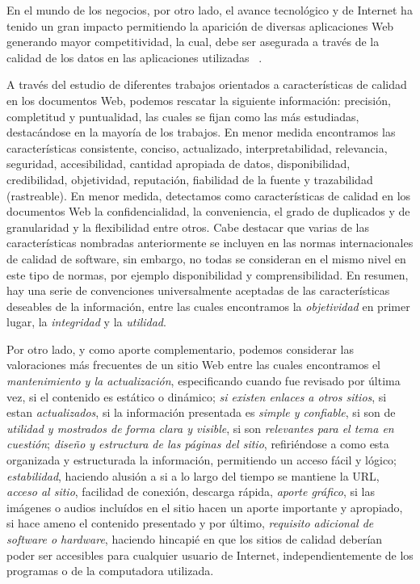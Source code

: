 En el mundo de los negocios, por otro lado, el avance tecnol\'ogico y de Internet ha tenido un gran impacto  permitiendo la aparici\'on de diversas aplicaciones Web generando mayor competitividad, la cual, debe ser asegurada a trav\'es de la calidad de los datos en las aplicaciones utilizadas ~\cite{MaCcIcMp:05}.

A trav\'es del estudio de diferentes trabajos orientados a caracter\'isticas de calidad en los documentos Web, podemos rescatar la siguiente informaci\'on: precisi\'on, completitud y puntualidad, las cuales se fijan como las m\'as estudiadas, destac\'andose en la mayor\'ia de los trabajos. En menor medida encontramos las caracter\'isticas consistente, conciso, actualizado, interpretabilidad, relevancia, seguridad, accesibilidad, cantidad apropiada de datos, disponibilidad, credibilidad, objetividad, reputaci\'on, fiabilidad de la fuente y trazabilidad (rastreable). En menor medida, detectamos como caracter\'isticas de calidad en los documentos Web la confidencialidad, la conveniencia, el grado de duplicados y de granularidad y la flexibilidad entre otros. Cabe destacar que varias de las caracter\'isticas nombradas anteriormente se incluyen en las normas internacionales de calidad de software, sin embargo, no todas se consideran en el mismo nivel en este tipo de normas, por ejemplo disponibilidad y comprensibilidad. En resumen, hay una serie de convenciones universalmente aceptadas de las caracter\'isticas deseables de la informaci\'on, entre las cuales encontramos la \emph{objetividad} en primer lugar, la \emph{integridad} y la \emph{utilidad}.

Por otro lado, y como aporte complementario, podemos considerar las valoraciones m\'as frecuentes de un sitio Web entre las cuales encontramos el \emph{mantenimiento y la actualizaci\'on}, especificando cuando fue revisado por \'ultima vez, si el contenido es est\'atico o din\'amico; \emph{si existen enlaces a otros sitios}, si estan \emph{actualizados}, si la informaci\'on presentada es \emph{simple y confiable}, si son de \emph{utilidad y  mostrados de forma clara y visible}, si son \emph{relevantes para el tema en cuesti\'on}; \emph{dise\~no y estructura de las p\'aginas del sitio}, refiri\'endose a como esta organizada y estructurada la informaci\'on, permitiendo un acceso f\'acil y l\'ogico; \emph{estabilidad}, haciendo alusi\'on a si a lo largo del tiempo se mantiene la URL, \emph{acceso al sitio}, facilidad de conexi\'on, descarga r\'apida, \emph{aporte gr\'afico}, si las im\'agenes o audios inclu\'idos en el sitio hacen un aporte importante y apropiado, si hace ameno el contenido presentado y por \'ultimo, \emph{requisito adicional de software o hardware}, haciendo hincapi\'e en que los sitios de calidad deber\'ian poder ser accesibles para cualquier usuario de Internet, independientemente de los programas o de la computadora utilizada.

